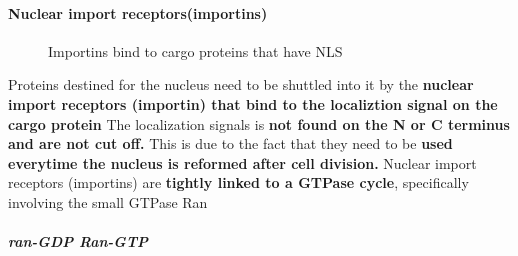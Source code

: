 \documentclass[../main.tex]{subfiles}
\begin{document}
\paragraph{Nuclear import receptors(importins)}
\begin{figure}[H]
    \centering
    \hspace{0.05\textwidth} %
    \caption{Importins bind to cargo proteins that have NLS}
    \label{fig:ITC_all}
\end{figure}





Proteins destined for the nucleus need to be shuttled into it by the \textbf{nuclear import receptors (\gls{importin}) that bind to the localiztion signal on the cargo protein} The localization signals is \textbf{not found on the N or C terminus and are not cut off.} This is due to the fact that they need to be\textbf{ used everytime the nucleus is reformed after cell division.}
Nuclear import receptors (importins) are \textbf{tightly linked to a GTPase cycle}, specifically involving the small GTPase Ran

\subparagraph{ran-GDP Ran-GTP}
\end{document}
